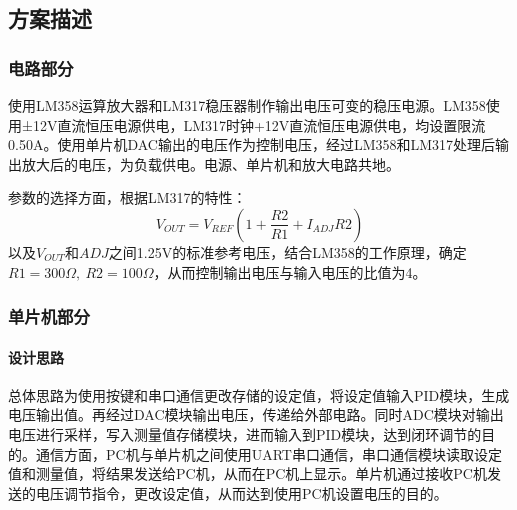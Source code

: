 \documentclass[a4paper]{article}
\theoremstyle{definition}
\theoremstyle{plain}
\theoremstyle{remark}
\begin{document}
\subsection{方案描述}
\subsubsection{电路部分}
使用LM358运算放大器和LM317稳压器制作输出电压可变的稳压电源。LM358使用±12V直流恒压电源供电，LM317时钟+12V直流恒压电源供电，均设置限流0.50A。使用单片机DAC输出的电压作为控制电压，经过LM358和LM317处理后输出放大后的电压，为负载供电。电源、单片机和放大电路共地。

参数的选择方面，根据LM317的特性：
\begin{equation*}
	V_{OUT}=V_{REF}(1+\frac{R2}{R1}+I_{ADJ}R2)
\end{equation*}
以及$V_{OUT}$和$ADJ$之间1.25V的标准参考电压，结合LM358的工作原理，确定$R1=300\Omega,\ R2=100\Omega$，从而控制输出电压与输入电压的比值为4。
\subsubsection{单片机部分}
\paragraph*{设计思路}
\vspace*{-0.5em}
总体思路为使用按键和串口通信更改存储的设定值，将设定值输入PID模块，生成电压输出值。再经过DAC模块输出电压，传递给外部电路。同时ADC模块对输出电压进行采样，写入测量值存储模块，进而输入到PID模块，达到闭环调节的目的。通信方面，PC机与单片机之间使用UART串口通信，串口通信模块读取设定值和测量值，将结果发送给PC机，从而在PC机上显示。单片机通过接收PC机发送的电压调节指令，更改设定值，从而达到使用PC机设置电压的目的。
\vspace*{-0.5em}
\end{document}
